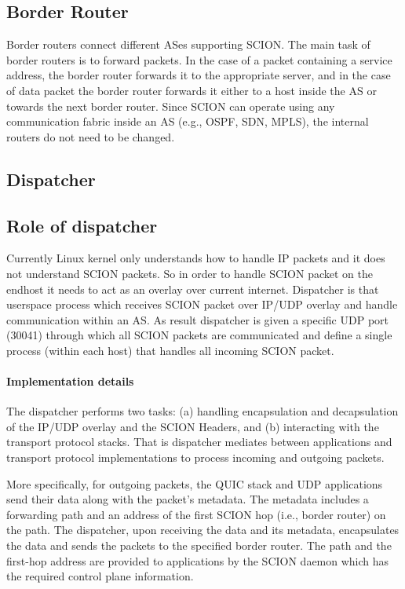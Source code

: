 \subsection{Border Router}
Border routers connect different ASes supporting SCION. The main task of border routers is to forward packets. In the case of a packet containing a service address, the border router forwards it to the appropriate server, and in the case of data packet the border router forwards it either to a host inside the AS or towards the next border router. Since SCION can operate using any communication fabric inside an AS (e.g., OSPF, SDN, MPLS), the internal routers do not need to be changed.

\subsection{Dispatcher}

\subsection{Role of dispatcher}
Currently Linux kernel only understands how to handle IP packets and it does not understand SCION packets. So in order to handle SCION packet on the endhost it needs to act as an overlay over current internet. Dispatcher is that userspace process which receives SCION packet over IP/UDP overlay and handle communication within an AS. As result dispatcher is given a specific UDP port (30041) through which all SCION packets are communicated and define a single process (within each host) that handles all incoming SCION packet.

\paragraph{Implementation details}
The dispatcher performs two tasks: (a) handling encapsulation and decapsulation of the IP/UDP overlay and the SCION Headers, and (b) interacting with the transport protocol stacks. That is dispatcher mediates between applications and transport protocol implementations to process incoming and outgoing packets.

More specifically, for outgoing packets, the QUIC stack and UDP applications send their data along with the packet's metadata. The metadata includes a forwarding path and an address of the first SCION hop (i.e., border router) on the path. The dispatcher, upon receiving the data and its metadata, encapsulates the data and sends the packets to the specified border router. The path and the first-hop address are provided to applications by the SCION daemon which has the required control plane information.

